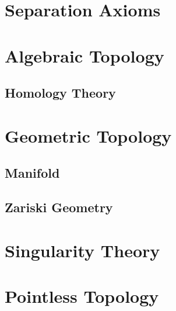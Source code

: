 \section{Separation Axioms}\label{sec:separation_axioms}



\section{Algebraic Topology}\label{sec:algebraic_topology}

\subsection{Homology Theory}\label{sec:homology_theory}



\section{Geometric Topology}\label{sec:geometric_topology}

\subsection{Manifold}\label{sec:manifold}

\subsection{Zariski Geometry}\label{sec:zariski_geometry}



\section{Singularity Theory}\label{sec:singularity_theory}



\section{Pointless Topology}\label{sec:pointless_topology}
